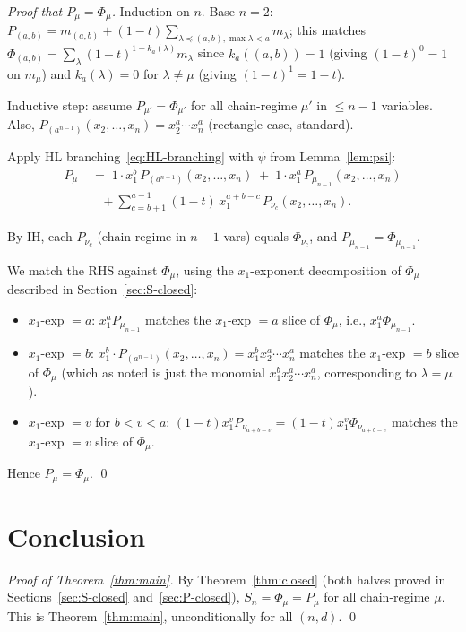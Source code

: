 \documentclass[11pt]{article}
\theoremstyle{definition}
\begin{document}
\begin{proof}[Proof that $P_\mu = \Phi_\mu$]
Induction on $n$. Base $n = 2$: $P_{(a,b)} = m_{(a,b)} + (1-t) \sum_{\lambda \preceq (a,b), \max \lambda < a} m_\lambda$; this matches $\Phi_{(a,b)} = \sum_\lambda (1-t)^{1-k_a(\lambda)} m_\lambda$
since $k_a((a,b)) = 1$ (giving $(1-t)^0 = 1$ on $m_\mu$) and $k_a(\lambda) = 0$
for $\lambda \ne \mu$ (giving $(1-t)^1 = 1-t$).

Inductive step: assume $P_{\mu'} = \Phi_{\mu'}$ for all chain-regime
$\mu'$ in $\le n - 1$ variables. Also, $P_{(a^{n-1})}(x_2, \ldots, x_n) = x_2^a \cdots x_n^a$ (rectangle case, standard).

Apply HL branching~\eqref{eq:HL-branching} with $\psi$ from
Lemma~\ref{lem:psi}:
\begin{align*}
  P_\mu &\;=\; 1 \cdot x_1^b\, P_{(a^{n-1})}(x_2, \ldots, x_n) \;+\; 1 \cdot x_1^a\, P_{\mu_{n-1}}(x_2, \ldots, x_n) \\
        &\quad + \sum_{c=b+1}^{a-1} (1-t)\, x_1^{a+b-c}\, P_{\nu_c}(x_2, \ldots, x_n).
\end{align*}

By IH, each $P_{\nu_c}$ (chain-regime in $n-1$ vars) equals
$\Phi_{\nu_c}$, and $P_{\mu_{n-1}} = \Phi_{\mu_{n-1}}$.

We match the RHS against $\Phi_\mu$, using the $x_1$-exponent decomposition
of $\Phi_\mu$ described in Section~\ref{sec:S-closed}:
\begin{itemize}
\item $x_1$-exp $= a$: $x_1^a P_{\mu_{n-1}}$ matches the $x_1$-exp $= a$
  slice of $\Phi_\mu$, i.e., $x_1^a \Phi_{\mu_{n-1}}$.
\item $x_1$-exp $= b$: $x_1^b \cdot P_{(a^{n-1})}(x_2, \ldots, x_n) = x_1^b x_2^a \cdots x_n^a$
  matches the $x_1$-exp $= b$ slice of $\Phi_\mu$ (which as noted is just
  the monomial $x_1^b x_2^a \cdots x_n^a$, corresponding to $\lambda = \mu$).
\item $x_1$-exp $= v$ for $b < v < a$: $(1-t) x_1^v P_{\nu_{a+b-v}} = (1-t) x_1^v \Phi_{\nu_{a+b-v}}$
  matches the $x_1$-exp $= v$ slice of $\Phi_\mu$.
\end{itemize}
Hence $P_\mu = \Phi_\mu$. \qed
\end{proof}

\section{Conclusion}\label{sec:conclusion}

\begin{proof}[Proof of Theorem~\ref{thm:main}]
By Theorem~\ref{thm:closed} (both halves proved in
Sections~\ref{sec:S-closed} and~\ref{sec:P-closed}), $S_n = \Phi_\mu = P_\mu$
for all chain-regime $\mu$. This is Theorem~\ref{thm:main}, unconditionally
for all $(n, d)$. \qed
\end{proof}
\end{document}
